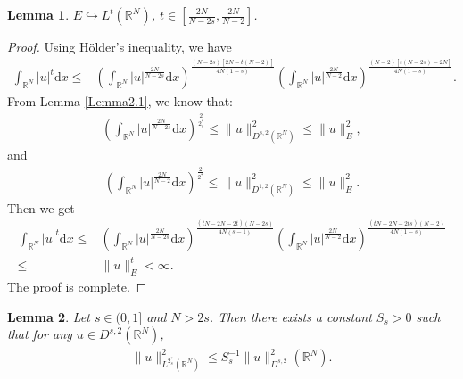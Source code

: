 \documentclass[12pt,a4paper,reqno]{amsart}
\numberwithin{equation}{section}
\newtheorem{lemma}{Lemma}[section]
\begin{document}
\begin{lemma}\label{Lemma2.2}
$E\hookrightarrow L^{t}(\mathbb{R}^{N})$, $t\in [\frac{2N}{N-2s},\frac{2N}{N-2}]$.
\end{lemma}

\begin{proof}
Using H\"{o}lder's inequality, we have
\begin{equation}\label{2.1}
\begin{aligned}
\int_{\mathbb{R}^{N}}
|u|^{t}
\mathrm{d}x
\leqslant&
\left(
\int_{\mathbb{R}^{N}}
|u|^{\frac{2N}{N-2s}}
\mathrm{d}x
\right)
^{\frac{(N-2s)[2N-t(N-2)]}{4N(1-s)}}
\left(
\int_{\mathbb{R}^{N}}
|u|^{\frac{2N}{N-2}}
\mathrm{d}x
\right)
^{\frac{(N-2)[t(N-2s)-2N]}{4N(1-s)}}.
\end{aligned}
\end{equation}
From Lemma \ref{Lemma2.1}, we know that:
\begin{equation*}
\begin{aligned}
\left(
\int_{\mathbb{R}^{N}}
|u|^{\frac{2N}{N-2s}}
\mathrm{d}x
\right)^{\frac{2}{2_{s}^{*}}}
\leqslant
\|u\|_{D^{s,2}(\mathbb{R}^{N})}^{2}
\leqslant \|u\|_{E}^{2},
\end{aligned}
\end{equation*}
and
\begin{equation*}
\begin{aligned}
\left(
\int_{\mathbb{R}^{N}}
|u|^{\frac{2N}{N-2}}
\mathrm{d}x
\right)^{\frac{2}{2^{*}}}
\leqslant
\|u\|_{D^{1,2}(\mathbb{R}^{N})}^{2}
\leqslant \|u\|_{E}^{2}.
\end{aligned}
\end{equation*}
Then we get
\begin{equation*}
\begin{aligned}
\int_{\mathbb{R}^{N}}
|u|^{t}
\mathrm{d}x
\leqslant&
\left(
\int_{\mathbb{R}^{N}}
|u|^{\frac{2N}{N-2s}}
\mathrm{d}x
\right)
^{\frac{(tN-2N-2t)(N-2s)}{4N(s-1)}}
\left(
\int_{\mathbb{R}^{N}}
|u|^{\frac{2N}{N-2}}
\mathrm{d}x
\right)
^{\frac{(tN-2N-2ts)(N-2)}{4N(1-s)}}\\
\leqslant&\|u\|_{E}^{t}<\infty.
\end{aligned}
\end{equation*}
The proof is complete.
\end{proof}

\begin{lemma}\label{Lemma2.3}
\cite[Theorem 1.1]{Cotsiolis-Tavoularis2004JMAA}
Let
$s\in(0,1]$
and $N>2s$.
Then there exists a constant
$S_{s}>0$
such that for
any
$u\in D^{s,2}(\mathbb{R}^{N})$,
\begin{equation*}
\begin{aligned}
\|u\|_{L^{2_{s}^{*}}(\mathbb{R}^{N})}^{2}
\leqslant
S_{s}^{-1}
\|u\|^{2}_{D^{s,2}}(\mathbb{R}^{N}).
\end{aligned}
\end{equation*}
\end{lemma}
\end{document}
